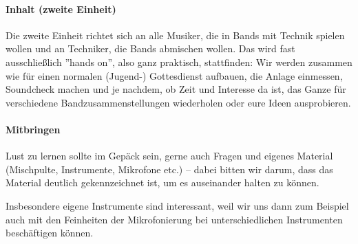 \documentclass[11pt,a4paper]{article}
\begin{document}
\setlength{\parskip}{0pt}
\paragraph{Inhalt (zweite Einheit)} Die zweite Einheit richtet sich an alle Musiker, die in Bands mit Technik spielen wollen und an Techniker, die Bands abmischen wollen. Das wird fast ausschließlich ''hands on'', also ganz praktisch, stattfinden: Wir werden zusammen wie für einen normalen (Jugend-) Gottesdienst aufbauen, die Anlage einmessen, Soundcheck machen und je nachdem, ob Zeit und Interesse da ist, das Ganze für verschiedene Bandzusammenstellungen wiederholen oder eure Ideen ausprobieren.

\paragraph{Mitbringen} Lust zu lernen sollte im Gepäck sein, gerne auch Fragen und eigenes Material (Mischpulte, Instrumente, Mikrofone etc.) -- dabei bitten wir darum, dass das Material deutlich gekennzeichnet ist, um es auseinander halten zu können.

Insbesondere eigene Instrumente sind interessant, weil wir uns dann zum Beispiel auch mit den Feinheiten der Mikrofonierung bei unterschiedlichen Instrumenten beschäftigen können.
\end{document}
